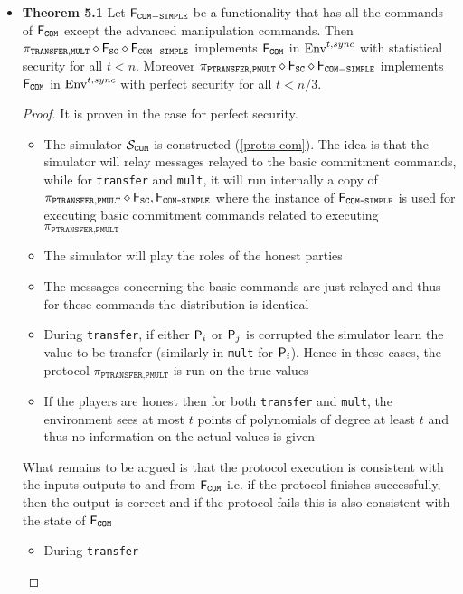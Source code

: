 \begin{itemize}
  \item \textbf{Theorem 5.1} Let $\F_{\mathtt{COM-SIMPLE}}$ be a functionality that has all the commands of $\F_{\mathtt{COM}}$ except the advanced manipulation commands. Then $\pi_{\mathtt{TRANSFER}, \mathtt{MULT}} \diamond \F_{\mathtt{SC}} \diamond \F_{\mathtt{COM-SIMPLE}}$ implements $\FCOM$ in $\Env^{t,sync}$ with statistical security for all $t <n$. Moreover $\pi_{\mathtt{PTRANSFER}, \mathtt{PMULT}} \diamond \F_{\mathtt{SC}} \diamond \F_{\mathtt{COM-SIMPLE}}$ implements $\FCOM$ in $\Env^{t,sync}$ with perfect security for all $t < n/3$.
  \begin{proof} 
    It is proven in the case for perfect security. 
    \begin{itemize}
      \item The simulator $\mathcal{S}_\COM$ is constructed (\autoref{prot:s-com}). The idea is that the simulator will relay messages relayed to the basic commitment commands, while for \texttt{transfer} and \texttt{mult}, it will run internally a copy of $\pi_{\texttt{PTRANSFER},\texttt{PMULT}} \diamond \F_{\texttt{SC}}, \F_{\texttt{COM-SIMPLE}}$ where the instance of $\F_{\texttt{COM-SIMPLE}}$ is used for executing basic commitment commands related to executing $\pi_{\texttt{PTRANSFER}, \texttt{PMULT}}$
      \item The simulator will play the roles of the honest parties 
      \item The messages concerning the basic commands are just relayed and thus for these commands the distribution is identical
      \item During \texttt{transfer}, if either $\P_i$ or $\P_j$ is corrupted the simulator learn the value to be transfer (similarly in \texttt{mult} for $\P_i$). Hence in these cases, the protocol $\pi_{\texttt{PTRANSFER},\texttt{PMULT}}$ is run on the true values
      \item If the players are honest then for both \texttt{transfer} and \texttt{mult}, the environment sees at most $t$ points of polynomials of degree at least $t$ and thus no information on the actual values is given
    \end{itemize}
    What remains to be argued is that the protocol execution is consistent with the inputs-outputs to and from $\FCOM$ i.e. if the protocol finishes successfully, then the output is correct and if the protocol fails this is also consistent with the state of $\FCOM$
    \begin{itemize}
    	\item During \texttt{transfer}

\end{itemize}
\end{proof}
\end{itemize}
